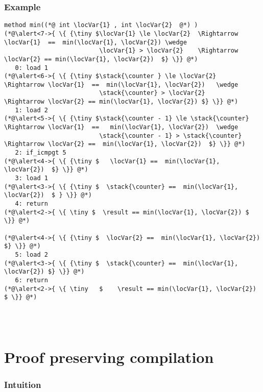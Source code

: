 \documentclass{beamer}
\begin{document}
\begin{frame}\frametitle{Example}
\begin{lstlisting}[language=jvmis]
method min((*@ int \locVar{1} , int \locVar{2}  @*) )
(*@\alert<7->{ \{ {\tiny $\locVar{1} \le \locVar{2}  \Rightarrow \locVar{1}  ==  min(\locVar{1}, \locVar{2}) \wedge 
                          \locVar{1} > \locVar{2}    \Rightarrow \locVar{2} == min(\locVar{1}, \locVar{2})  $} \}} @*)
   0: load 1
(*@\alert<6->{ \{ {\tiny $\stack{\counter } \le \locVar{2}  \Rightarrow \locVar{1}  ==  min(\locVar{1}, \locVar{2})   \wedge 
                          \stack{\counter} > \locVar{2}     \Rightarrow \locVar{2} == min(\locVar{1}, \locVar{2}) $} \}} @*)
   1: load 2
(*@\alert<5->{ \{ {\tiny $\stack{\counter - 1} \le \stack{\counter}  \Rightarrow \locVar{1}  ==   min(\locVar{1}, \locVar{2})  \wedge 
                          \stack{\counter - 1} > \stack{\counter}    \Rightarrow \locVar{2} ==  min(\locVar{1}, \locVar{2})  $} \}} @*)
   2: if_icmpgt 5
(*@\alert<4->{ \{ {\tiny $   \locVar{1} ==  min(\locVar{1}, \locVar{2})  $} \}} @*)
   3: load 1
(*@\alert<3->{ \{ {\tiny $  \stack{\counter} ==  min(\locVar{1}, \locVar{2})  $ } \}} @*)
   4: return
(*@\alert<2->{ \{ \tiny $  \result == min(\locVar{1}, \locVar{2}) $  \}} @*)

(*@\alert<4->{ \{ {\tiny $  \locVar{2} ==  min(\locVar{1}, \locVar{2})  $} \}} @*)
   5: load 2
(*@\alert<3->{ \{ {\tiny $  \stack{\counter} ==  min(\locVar{1}, \locVar{2}) $} \}} @*)
   6: return
(*@\alert<2->{ \{ \tiny   $    \result == min(\locVar{1}, \locVar{2}) $ \}} @*)




\end{lstlisting}
\end{frame}



\section{Proof preserving compilation}

\begin{frame}[shrink]\frametitle{Intuition}
     \begin{center}
     \end{center}
\end{frame}
\end{document}
